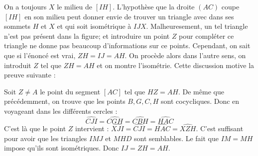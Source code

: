 \begin{sol}
\begin{center}
\end{center}

On a toujours $X$ le milieu de $[IH]$. L'hypothèse que la droite $(AC)$ coupe $[IH]$ en son milieu peut donner envie de trouver un triangle avec dans ses sommets $H$ et $X$ et qui soit isométrique à $IJX$. Malheuresement, un tel triangle n'est pas présent dans la figure; et introduire un point $Z$ pour compléter ce triangle ne donne pas beaucoup d'informations sur ce points. Cependant, on sait que si l'énoncé est vrai, $ZH=IJ=AH$. On procède alors dans l'autre sens, on introduit $Z$ tel que $ZH=AH$ et on montre l'isométrie. Cette discussion motive la preuve suivante :

Soit $Z\neq A$ le point du segment $[AC]$ tel que $HZ=AH$.
De même que précédemment, on trouve que les points $B,G,C,H$ sont cocycliques. Donc en voyageant dans les différents cercles : $$\widehat{CJI}=\widehat{CGH}=\widehat{CBH}=\widehat{HAC}$$
C'est là que le point $Z$ intervient : $\widehat{XJI}=\widehat{CJI}=\widehat{HAC}=\widehat{XZH}$. C'est suffisant pour avoir que les triangles $IMJ$ et $MHD$ sont semblables. Le fait que $IM=MH$ impose qu'ils sont isométriques. Donc $IJ=ZH=AH$.
\end{sol}


